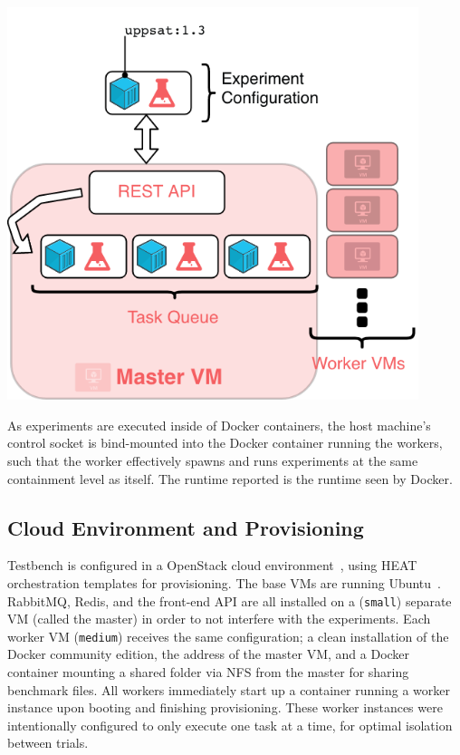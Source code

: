 \documentclass{article}
\begin{document}
\begin{multicols}{2}
\begin{Figure}
  \centering
  \includegraphics[width=0.9\textwidth]{architecture}
  \label{fig:architecture}
\end{Figure}

As experiments are executed inside of Docker containers, the host machine's
control socket is bind-mounted into the Docker container running the workers,
such that the worker effectively spawns and runs experiments at the same
containment level as itself. The runtime reported is the runtime seen by Docker.

\subsection*{Cloud Environment and Provisioning}

Testbench is configured in a OpenStack cloud environment~\cite{openstack}, using
HEAT orchestration templates for provisioning. The base VMs are running
Ubuntu~. RabbitMQ, Redis, and the front-end API are all installed
on a (\texttt{small}) separate VM (called the master) in order to not interfere
with the experiments. Each worker VM (\texttt{medium}) receives the same
configuration; a clean installation of the Docker community edition, the address
of the master VM, and a Docker container mounting a shared folder via NFS from
the master for sharing benchmark files. All workers immediately start up a
container running a worker instance upon booting and finishing provisioning.
These worker instances were intentionally configured to only execute one task at
a time, for optimal isolation between trials.


\end{multicols}
\end{document}
